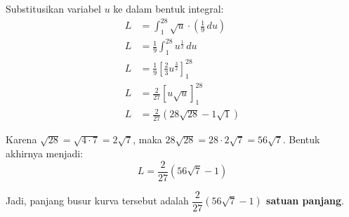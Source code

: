 \documentclass[12pt,a4paper]{article}
\begin{document}
Substitusikan variabel $u$ ke dalam bentuk integral:
\begin{align*}
  L &= \int_{1}^{28} \sqrt{u} \cdot \left(\frac{1}{9} \, du\right) \\
  L &= \frac{1}{9} \int_{1}^{28} u^{\frac{1}{2}} \, du \\
  L &= \frac{1}{9} \left[ \frac{2}{3}u^{\frac{3}{2}} \right]_{1}^{28} \\
  L &= \frac{2}{27} \left[ u\sqrt{u} \right]_{1}^{28} \\
  L &= \frac{2}{27} \left( 28\sqrt{28} - 1\sqrt{1} \right)
\end{align*}

Karena $\sqrt{28} = \sqrt{4 \cdot 7} = 2\sqrt{7}$, maka $28\sqrt{28} = 28 \cdot 2\sqrt{7} = 56\sqrt{7}$. Bentuk akhirnya menjadi:
\begin{equation*}
  L = \frac{2}{27} \left( 56\sqrt{7} - 1 \right)
\end{equation*}

Jadi, panjang busur kurva tersebut adalah \textbf{$\dfrac{2}{27} \left( 56\sqrt{7} - 1 \right)$ satuan panjang}.
\end{document}
